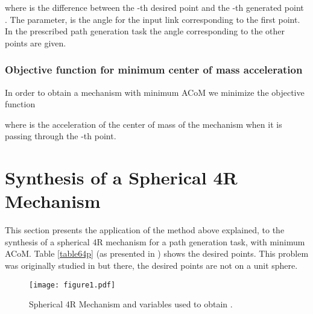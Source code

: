 \documentclass[11pt]{article}
\begin{document}
where  is the difference 
between the -th desired point  and   the -th 
generated point .
The  parameter, is the angle  for the input link corresponding 
to the first point. In the prescribed path generation task the angle 
corresponding to the other points are given. 

\subsubsection{Objective function for minimum center of  mass 
acceleration}
In order to obtain a mechanism with minimum ACoM we minimize 
the objective function
  
  where  is the acceleration of the center of 
  mass of the mechanism when it is passing through the -th point. 

\section{Synthesis of a Spherical 4R Mechanism}\label{sec3}
This section presents the application of the method above explained, to 
the synthesis of a spherical 4R mechanism for a path generation task, 
with minimum ACoM. Table \ref{table64p} (as presented in 
\cite{Mullineux2011}) shows the desired points. This problem was
originally studied in \cite{ChuSun2010} but there, the desired points 
are not on a unit sphere. 
\begin{figure}[htb]
\begin{center}
\texttt{[image: figure1.pdf]} 
\caption{Spherical 4R Mechanism and variables used to obtain 
.}
\label{figure1}
\end{center}
\end{figure}
\end{document}
